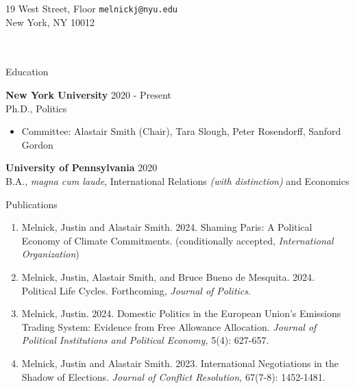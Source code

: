 \documentclass{resume} %
\begin{document}
19 West  Street,  Floor \hfill \texttt{melnickj@nyu.edu}\\
New York, NY 10012 \hfill \texttt{\href{justinmelnick.github.io}{}} \\\\\\
\begin{rSection}{Education}

{\bf New York University} \hfill { 2020 - Present} \\
Ph.D., Politics 
\begin{itemize}
    \item Committee: Alastair Smith (Chair), Tara Slough, Peter Rosendorff, Sanford Gordon
\end{itemize}
\vspace*{0.075in}

{\bf University of Pennsylvania} \hfill { 2020} 
\\B.A., \emph{magna cum laude}, International Relations \emph{(with distinction)} and Economics


\end{rSection}

\begin{rSection}{Publications}

\begin{enumerate}
           \item Melnick, Justin and Alastair Smith. 2024. Shaming Paris: A Political Economy of Climate Commitments. (conditionally accepted, \textit{International Organization})
 \item Melnick, Justin, Alastair Smith, and Bruce Bueno de Mesquita. 2024. Political Life Cycles. Forthcoming, \textit{Journal of Politics}.
\item Melnick, Justin. 2024. Domestic Politics in the European Union’s Emissions Trading System: Evidence from Free Allowance Allocation. \textit{Journal of Political Institutions and Political Economy,} 5(4): 627-657.
    \item Melnick, Justin and Alastair Smith. 2023. International Negotiations in the Shadow of Elections.  \textit{Journal of Conflict Resolution,} 67(7-8): 1452-1481.
\end{enumerate}

\end{rSection}
\end{document}
